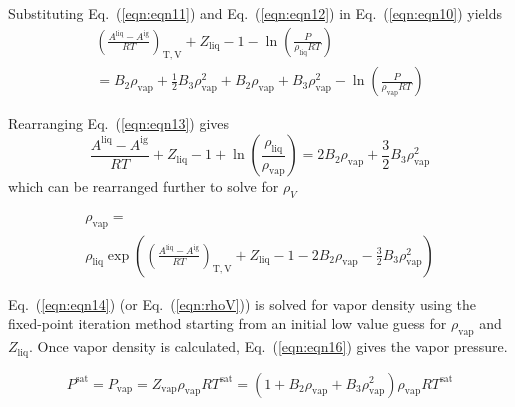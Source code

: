 \documentclass[%
 aip,
 jcp,
 sd,%
 amsmath,amssymb,
 reprint,%
]{revtex4-1}
\begin{document}
Substituting Eq.~(\ref{eqn:eqn11}) and Eq.~(\ref{eqn:eqn12}) in Eq.~(\ref{eqn:eqn10}) yields
\begin{equation}
\begin{array}{l}{\left( {\frac{{{A^{\mathrm{liq}}} - {A^{\mathrm{ig}}}}}{{RT}}} \right)_{\mathrm{T,V}}} + {Z_{\mathrm{liq}}} - 1 - \ln \left( \frac{P}{{{\rho _{\mathrm{liq}}}RT}} \right) \\ = {B_2}{\rho _{\mathrm{vap}}} +
\frac{1}{2}{B_3}\rho _{\mathrm{vap}}^2 + {B_2}{\rho _{\mathrm{vap}}} + {B_3}\rho _{\mathrm{vap}}^2 - \ln \left( \frac{P}{{{\rho _{\mathrm{vap}}}RT}} \right) \end{array}
 \label{eqn:eqn13}
\end{equation}

Rearranging Eq.~(\ref{eqn:eqn13}) gives
\begin{equation}
\frac{{{A^{\mathrm{liq}}} - {A^{\mathrm{ig}}}}}{{RT}} + {Z_{\mathrm{liq}}} - 1 + \ln \left( \frac{{{\rho _{\mathrm{liq}}}}}{{{\rho _{\mathrm{vap}}}}} \right) = 2{B_2} {\rho _{\mathrm{vap}}} + \frac{3}{2}{B_3} \rho _{\mathrm{vap}}^2 \label{eqn:eqn14}
\end{equation}
which can be rearranged further to solve for ${\rho _V}$

\begin{equation}
\begin{array}{l}
{\rho _{\mathrm{vap}} = }
\\ 
{{\rho _{\mathrm{liq}}}\exp \left( {{{\left( {\frac{{{A^{\mathrm{liq}}} - {A^{\mathrm{ig}}}}}{{RT}}} \right)}_{\mathrm{T,V}}} + {Z_{\mathrm{liq}}} - 1 - 2{B_2} {\rho _{\mathrm{vap}}} - \frac{3}{2}{B_3} \rho _{\mathrm{vap}}^2}
\right) }  
\end{array}
\label{eqn:rhoV}
\end{equation}

Eq.~(\ref{eqn:eqn14}) (or Eq.~(\ref{eqn:rhoV})) is solved for vapor density using the fixed-point iteration method \cite{Burden1985} starting from an initial low value guess for $\rho_\mathrm{vap}$ and $Z_\mathrm{liq}$. Once vapor density is calculated, Eq.~(\ref{eqn:eqn16}) gives the vapor pressure.

\begin{equation}
P^\mathrm{sat} = P_\mathrm{vap} = {Z_\mathrm{vap}}{\rho _\mathrm{vap}}RT^\mathrm{sat} = (1 + {B_2} {\rho_\mathrm{vap}} + {B_3}\rho _\mathrm{vap}^2){\rho _\mathrm{vap}}RT^\mathrm{sat} 
\label{eqn:eqn16}
\end{equation}
\end{document}
